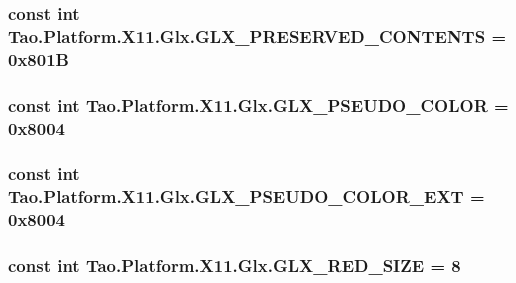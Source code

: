 \label{class_tao_1_1_platform_1_1_x11_1_1_glx_abb8f9b7e88bfa3589924a83107ba014d}
\hypertarget{class_tao_1_1_platform_1_1_x11_1_1_glx_a33545f2488ed80af9bce684fe52d0215}{
\subsubsection[{GLX\_\-PRESERVED\_\-CONTENTS}]{\setlength{\rightskip}{0pt plus 5cm}const int {\bf Tao.Platform.X11.Glx.GLX\_\-PRESERVED\_\-CONTENTS} = 0x801B}}
\label{class_tao_1_1_platform_1_1_x11_1_1_glx_a33545f2488ed80af9bce684fe52d0215}
\hypertarget{class_tao_1_1_platform_1_1_x11_1_1_glx_a98cc081d53938af1a9ed0512a1b8ed98}{
\subsubsection[{GLX\_\-PSEUDO\_\-COLOR}]{\setlength{\rightskip}{0pt plus 5cm}const int {\bf Tao.Platform.X11.Glx.GLX\_\-PSEUDO\_\-COLOR} = 0x8004}}
\label{class_tao_1_1_platform_1_1_x11_1_1_glx_a98cc081d53938af1a9ed0512a1b8ed98}
\hypertarget{class_tao_1_1_platform_1_1_x11_1_1_glx_a7e15ee0e44da343b4ea0eff6b8137a56}{
\subsubsection[{GLX\_\-PSEUDO\_\-COLOR\_\-EXT}]{\setlength{\rightskip}{0pt plus 5cm}const int {\bf Tao.Platform.X11.Glx.GLX\_\-PSEUDO\_\-COLOR\_\-EXT} = 0x8004}}
\label{class_tao_1_1_platform_1_1_x11_1_1_glx_a7e15ee0e44da343b4ea0eff6b8137a56}
\hypertarget{class_tao_1_1_platform_1_1_x11_1_1_glx_a033dbf660bd6df8f09dba42972b69a0b}{
\subsubsection[{GLX\_\-RED\_\-SIZE}]{\setlength{\rightskip}{0pt plus 5cm}const int {\bf Tao.Platform.X11.Glx.GLX\_\-RED\_\-SIZE} = 8}}
